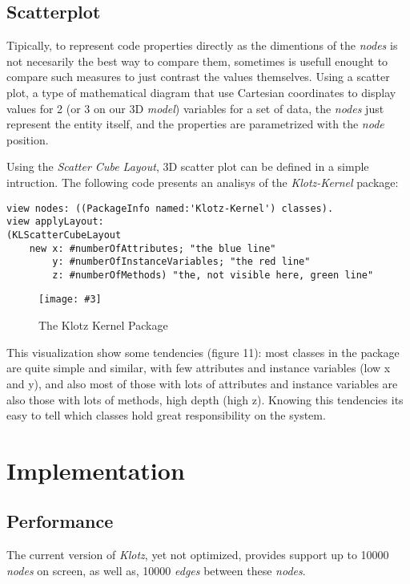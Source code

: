 \documentclass{sig-alternate}
\newcommand{\fig}[4]{
	\begin{figure}[#1]
		\centering
		\texttt{[image: \#3]}
		\caption{\label{fig:#3}#4}
	\end{figure}}
\newcommand{\seclabel}[1]{\label{sec:#1}}
\begin{document}
\subsection{Scatterplot}
Tipically, to represent code properties directly as the dimentions
of the \emph{nodes} is not necesarily the best way to compare 
them, sometimes is usefull enought to compare such measures to 
just contrast the values themselves. Using a scatter plot, 
a type of mathematical diagram that use Cartesian coordinates to 
display values for 2 (or 3 on our 3D \emph{model}) variables for 
a set of data, the \emph{nodes} just represent the entity itself, 
and the properties are  parametrized with the \emph{node} position.

Using the \emph{Scatter Cube Layout}, 3D scatter plot can be defined
in a simple intruction. The following code presents an analisys of
the \emph{Klotz-Kernel} package:

\begin{lstlisting}
view nodes: ((PackageInfo named:'Klotz-Kernel') classes).
view applyLayout: 
(KLScatterCubeLayout 
	new x: #numberOfAttributes; "the blue line"
		y: #numberOfInstanceVariables; "the red line"
		z: #numberOfMethods) "the, not visible here, green line" 
\end{lstlisting}

\fig{}{0.4}{figure11.png}{The Klotz Kernel Package}

This visualization show some tendencies (figure 11):
most classes in the package are quite simple and similar,
with few attributes and instance variables (low x and y), and 
also most of those with lots of attributes and instance variables
are also those with lots of methods, high depth (high z). Knowing
this tendencies its easy to tell which classes hold great 
responsibility on the system.




\section{Implementation} \seclabel{implementation}


\subsection{Performance}
The current version of \emph{Klotz}, yet not optimized, provides
support up to 10000 \emph{nodes} on screen, as well as, 
10000 \emph{edges} between these \emph{nodes}.
\end{document}
